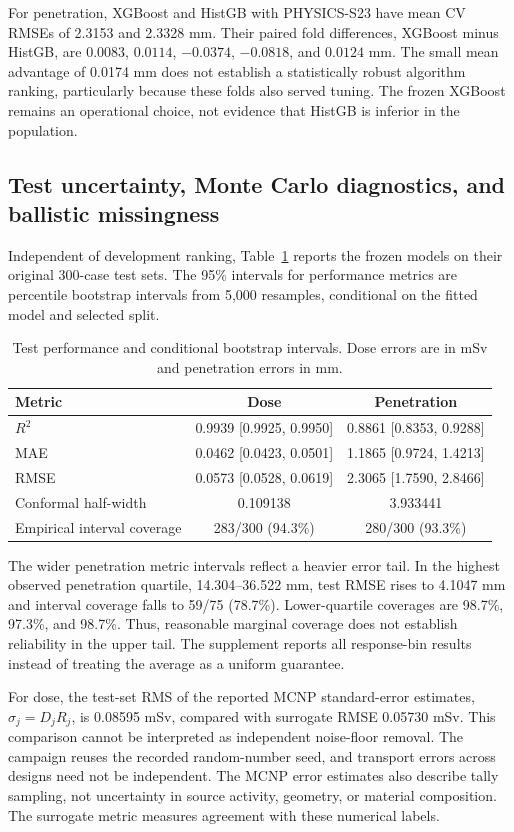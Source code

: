\documentclass[12pt]{elsarticle}
\begin{document}
For penetration, XGBoost and HistGB with PHYSICS-S23 have mean CV RMSEs of 2.3153 and 2.3328 mm. Their paired fold differences, XGBoost minus HistGB, are $0.0083$, $0.0114$, $-0.0374$, $-0.0818$, and $0.0124$ mm. The small mean advantage of 0.0174 mm does not establish a statistically robust algorithm ranking, particularly because these folds also served tuning. The frozen XGBoost remains an operational choice, not evidence that HistGB is inferior in the population.

\subsection{Test uncertainty, Monte Carlo diagnostics, and ballistic missingness}
Independent of development ranking, Table~\ref{tab:test} reports the frozen models on their original 300-case test sets. The 95\% intervals for performance metrics are percentile bootstrap intervals from 5,000 resamples, conditional on the fitted model and selected split.
\begin{table}[H]\centering\small
\caption{Test performance and conditional bootstrap intervals. Dose errors are in mSv and penetration errors in mm.}\label{tab:test}
\begin{tabular}{@{}lcc@{}}\toprule
Metric & Dose & Penetration\\\midrule
$R^2$ &0.9939 [0.9925, 0.9950]&0.8861 [0.8353, 0.9288]\\
MAE &0.0462 [0.0423, 0.0501]&1.1865 [0.9724, 1.4213]\\
RMSE &0.0573 [0.0528, 0.0619]&2.3065 [1.7590, 2.8466]\\
Conformal half-width &0.109138&3.933441\\
Empirical interval coverage &283/300 (94.3\%)&280/300 (93.3\%)\\\bottomrule
\end{tabular}\end{table}
The wider penetration metric intervals reflect a heavier error tail. In the highest observed penetration quartile, 14.304--36.522 mm, test RMSE rises to 4.1047 mm and interval coverage falls to 59/75 (78.7\%). Lower-quartile coverages are 98.7\%, 97.3\%, and 98.7\%. Thus, reasonable marginal coverage does not establish reliability in the upper tail. The supplement reports all response-bin results instead of treating the average as a uniform guarantee.

For dose, the test-set RMS of the reported MCNP standard-error estimates, $\sigma_j=D_jR_j$, is 0.08595 mSv, compared with surrogate RMSE 0.05730 mSv. This comparison cannot be interpreted as independent noise-floor removal. The campaign reuses the recorded random-number seed, and transport errors across designs need not be independent. The MCNP error estimates also describe tally sampling, not uncertainty in source activity, geometry, or material composition. The surrogate metric measures agreement with these numerical labels.
\end{document}
